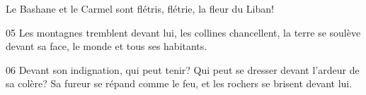 Le Bashane et le Carmel sont flétris, flétrie, la fleur du Liban!

05 Les montagnes tremblent devant lui, les collines chancellent, la terre se soulève devant sa face, le monde et tous ses habitants.

06 Devant son indignation, qui peut tenir? Qui peut se dresser devant l’ardeur de sa colère? Sa fureur se répand comme le feu, et les rochers se brisent devant lui.
